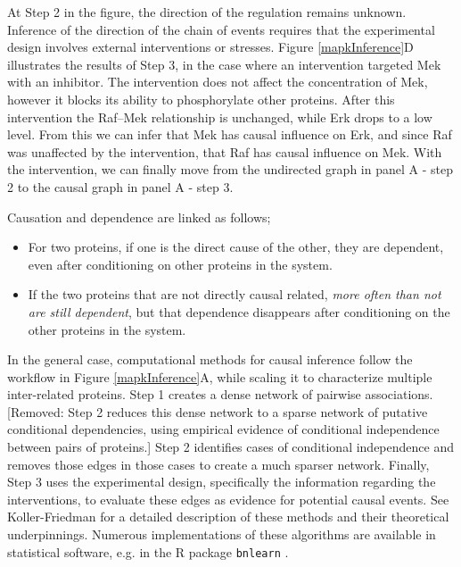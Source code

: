 \documentclass[journal=jacsat,manuscript=article]{achemso}
\def\added#1{{\color{blue} #1}}
\def\removed#1{{\color{magenta}[Removed: #1]}}
\begin{document}
\added{At Step 2 in the figure,} the direction of the regulation remains unknown. Inference of the direction of the chain of events requires that the experimental design involves external interventions or stresses. Figure \ref{mapkInference}D illustrates the results of Step 3, in the case where an intervention targeted Mek with an inhibitor. The intervention does not affect the concentration of Mek, however it blocks its ability to phosphorylate other proteins.  After this intervention the Raf--Mek relationship is unchanged, while Erk drops to a low level.  From this we can infer that Mek has causal influence on Erk, and since Raf was unaffected by the intervention, that Raf has causal influence on Mek.  With the intervention, we can finally move from the undirected graph in panel A - step 2 to the causal graph in panel A - step 3.

\added{Causation and dependence are linked as follows;
\begin{itemize}
\item For two proteins, if one is the direct cause of the other, they are dependent, even after conditioning on other proteins in the system.
\item If the two proteins that are not directly causal related, {\it more often than not are still dependent}, but that dependence disappears after conditioning on the other proteins in the system.
\end{itemize}}  


In the general case, computational methods for causal inference follow the workflow  in Figure \ref{mapkInference}A, while scaling it to characterize multiple inter-related proteins. Step 1 creates a dense network of pairwise associations. \removed{Step 2 reduces this dense network to a sparse network of putative conditional dependencies, using empirical evidence of conditional independence between pairs of proteins.} \added{Step 2 identifies cases of conditional independence and removes those edges in those cases to create a much sparser network.}  Finally, Step 3 uses the experimental design, specifically the information regarding the interventions, to evaluate these edges as evidence for potential causal events.  See Koller-Friedman \cite{koller2009probabilistic} for a detailed description of these methods and their theoretical underpinnings. Numerous implementations of these algorithms are available in statistical software, e.g. in the R package {\tt bnlearn} \cite{scutari2009learning}. 


\end{document}
